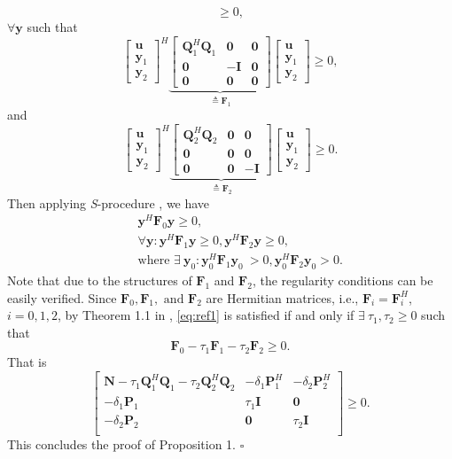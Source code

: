 \documentclass[review,sort&compress]{elsarticle}
\renewcommand{\vec}[1]{\mbox{$\mathbf{#1}$}}
\newcommand{\defi}{\triangleq}
\newcommand{\nn}{\nonumber}
\newcommand{\vy}{\vec{y}}
\newcommand{\vP}{\vec{P}}
\newcommand{\vI}{\vec{I}}
\newcommand{\vQ}{\vec{Q}}
\newcommand{\vN}{\vec{N}}
\newcommand{\vu}{\vec{u}}
\newcommand{\vF}{\vec{F}}
\begin{document}
\begin{pop1}
\[\geq 0,
\]
$\forall \vy$ such that
\[
\begin{bmatrix} \vu \\ \vy_1 \\ \vy_2 \end{bmatrix}^H
\underbrace{\begin{bmatrix}
\vQ_1^H \vQ_1 & \vec{0} & \vec{0} \\
\vec{0}       & -\vI    & \vec{0} \\
\vec{0}       & \vec{0} & \vec{0}
\end{bmatrix}}_{\defi \vF_1}
\begin{bmatrix} \vu \\ \vy_1 \\ \vy_2 \end{bmatrix}
\geq 0,
\]
and
\[
\begin{bmatrix} \vu \\ \vy_1 \\ \vy_2 \end{bmatrix}^H
\underbrace{\begin{bmatrix}
\vQ_2^H \vQ_2 & \vec{0} & \vec{0} \\
\vec{0}       & \vec{0} & \vec{0} \\
\vec{0}       & \vec{0} & -\vI
\end{bmatrix}}_{\defi \vF_2}
\begin{bmatrix} \vu \\ \vy_1 \\ \vy_2 \end{bmatrix}
\geq 0.
\]
Then applying {\em S}-procedure \cite{boyd}, we have
\begin{eqnarray}\label{eq:ref1}
  && \vy^H \vF_0 \vy \geq 0, \nn\\
  && \forall \vy : \vy^H \vF_1 \vy \geq 0, \vy^H \vF_2 \vy \geq 0, \nn\\
  && \text{where }\exists \: \vy_0 : \vy_0^H \vF_1 \vy_0\ > 0, \vy_0^H \vF_2 \vy_0> 0.
\end{eqnarray}
Note that due to the structures of $\vF_1$ and $\vF_2$, the regularity conditions can be easily verified. Since $\vF_0, \vF_1, \text{ and }\vF_2$ are Hermitian matrices, i.e., $\vF_i = \vF_i^H$, $i=0,1,2$, by Theorem 1.1 in \cite{s1}, \eqref{eq:ref1} is satisfied if and only if $\exists \: \tau_1, \tau_2 \geq 0$ such that
\[
\vF_0-\tau_1\vF_1-\tau_2\vF_2 \geq 0.
\]
That is
\[
\begin{bmatrix}
\vN - \tau_1 \vQ_1^H \vQ_1 - \tau_2 \vQ_2^H \vQ_2   & -\delta_1 \vP_1^H & -\delta_2 \vP_2^H  \\
-\delta_1\vP_1                                      & \tau_1 \vI        & \vec{0}  \\
-\delta_2\vP_2                                      &  \vec{0}          & \tau_2 \vI  \\
\end{bmatrix} \geq 0.
\]
This concludes the proof of Proposition 1. \hfill $\square$
\end{pop1}
\end{document}

